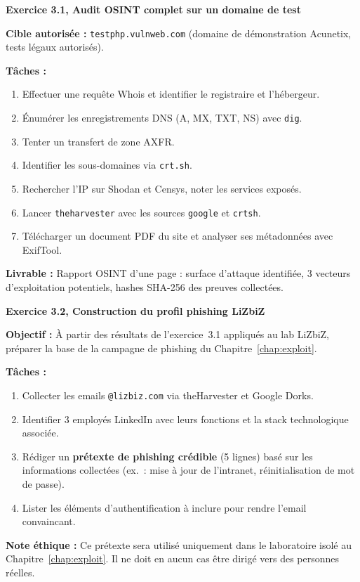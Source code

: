 \begin{boxexo}
\textbf{Exercice 3.1, Audit OSINT complet sur un domaine de test}

\medskip
\textbf{Cible autorisée :} \texttt{testphp.vulnweb.com}
(domaine de démonstration Acunetix, tests légaux autorisés).

\medskip
\textbf{Tâches :}
\begin{enumerate}
    \item Effectuer une requête Whois et identifier le registraire et l'hébergeur.
    \item Énumérer les enregistrements DNS (A, MX, TXT, NS) avec \texttt{dig}.
    \item Tenter un transfert de zone AXFR.
    \item Identifier les sous-domaines via \texttt{crt.sh}.
    \item Rechercher l'IP sur Shodan et Censys, noter les services exposés.
    \item Lancer \texttt{theharvester} avec les sources \texttt{google} et
          \texttt{crtsh}.
    \item Télécharger un document PDF du site et analyser ses métadonnées
          avec ExifTool.
\end{enumerate}

\medskip
\textbf{Livrable :} Rapport OSINT d'une page : surface d'attaque identifiée,
3 vecteurs d'exploitation potentiels, hashes SHA-256 des preuves collectées.
\end{boxexo}

\begin{boxexo}
\textbf{Exercice 3.2, Construction du profil phishing LiZbiZ}

\medskip
\textbf{Objectif :} À partir des résultats de l'exercice~3.1 appliqués au
lab LiZbiZ, préparer la base de la campagne de phishing du
Chapitre~\ref{chap:exploit}.

\medskip
\textbf{Tâches :}
\begin{enumerate}
    \item Collecter les emails \texttt{@lizbiz.com} via theHarvester
          et Google Dorks.
    \item Identifier 3 employés LinkedIn avec leurs fonctions et la stack
          technologique associée.
    \item Rédiger un \textbf{prétexte de phishing crédible} (5 lignes) basé
          sur les informations collectées (ex.~: mise à jour de l'intranet,
          réinitialisation de mot de passe).
    \item Lister les éléments d'authentification à inclure pour rendre
          l'email convaincant.
\end{enumerate}

\medskip
\textbf{Note éthique :} Ce prétexte sera utilisé uniquement dans le
laboratoire isolé au Chapitre~\ref{chap:exploit}. Il ne doit en aucun cas
être dirigé vers des personnes réelles.
\end{boxexo}
